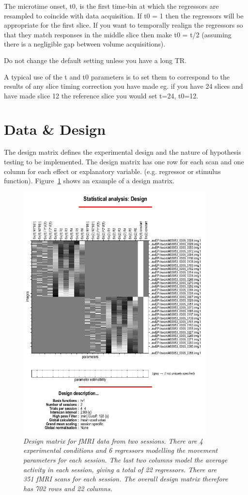 The microtime onset, t0, is the first time-bin at which the regressors are resampled to coincide with data acquisition.  If t0 = 1 then the regressors will be appropriate for the first slice.  If you want to temporally realign the regressors so that they match responses in the middle slice then make t0 = t/2 (assuming there is a negligible gap between volume acquisitions).

Do not change the default setting unless you have a long TR. 

A typical use of the t and t0 parameters is to set them to correspond to the results of any slice timing correction you have made eg. if you have 24 slices and have made slice 12 the reference slice you would set t=24, t0=12. 

\section{Data \& Design}

The design matrix defines the experimental design and the nature of hypothesis testing to be implemented.  The design matrix has one row for each scan and one column for each effect or explanatory variable. (e.g. regressor or stimulus function).  Figure~\ref{design} shows an example of a design matrix.

\begin{figure}
\begin{center}
\includegraphics[width=100mm]{fmri_spec/design}
\end{center}
\caption{\em Design matrix for fMRI data from two sessions. There are 4 experimental conditions and 6 regressors modelling the movement parameters for each session. The last two columns model the average activity in each session, giving a total of 22 regressors. There are 351 fMRI scans for each session. The overall design matrix therefore has 702 rows and 22 columns. \label{design}}
\end{figure}

